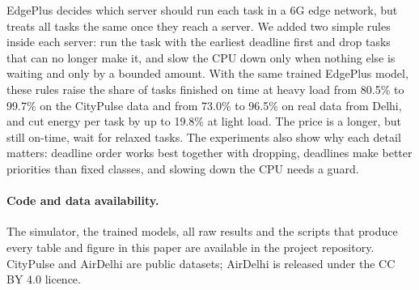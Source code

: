 \documentclass[11pt]{article}
\theoremstyle{definition}
\begin{document}
EdgePlus decides which server should run each task in a 6G edge network, but treats all tasks the same once they
reach a server. We added two simple rules inside each server: run the task with the earliest deadline first and
drop tasks that can no longer make it, and slow the CPU down only when nothing else is waiting and only by a
bounded amount. With the same trained EdgePlus model, these rules raise the share of tasks finished on time at
heavy load from 80.5\% to 99.7\% on the CityPulse data and from 73.0\% to 96.5\% on real data from Delhi, and cut
energy per task by up to 19.8\% at light load. The price is a longer, but still on-time, wait for relaxed tasks.
The experiments also show why each detail matters: deadline order works best together with dropping, deadlines
make better priorities than fixed classes, and slowing down the CPU needs a guard.

\paragraph{Code and data availability.}

The simulator, the trained models, all raw results and the scripts that produce every table and figure in this
paper are available in the project repository. CityPulse and AirDelhi are public datasets; AirDelhi is released
under the CC BY 4.0 licence.

\end{document}
